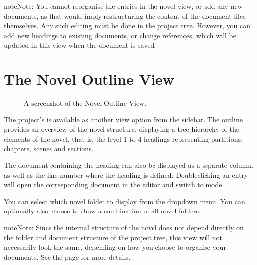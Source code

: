 \documentclass[a4paper,11pt,english]{sphinxmanual}
\begin{document}
\begin{sphinxadmonition}{note}{Note:}
\sphinxAtStartPar
You cannot reorganise the entries in the novel view, or add any new documents, as that would
imply restructuring the content of the document files themselves. Any such editing must be done
in the project tree. However, you can add new headings to existing documents, or change
references, which will be updated in this view when the document is saved.
\end{sphinxadmonition}


\section{The Novel Outline View}
\label{\detokenize{usage_project:the-novel-outline-view}}\label{\detokenize{usage_project:a-ui-outline}}
\begin{figure}[htbp]
\centering
\capstart

\noindent{}
\caption{A screenshot of the Novel Outline View.}\label{\detokenize{usage_project:id5}}\end{figure}

\sphinxAtStartPar
The project’s  is available as another view option from the sidebar. The
outline provides an overview of the novel structure, displaying a tree hierarchy of the elements of
the novel, that is, the level 1 to 4 headings representing partitions, chapters, scenes and
sections.

\sphinxAtStartPar
The document containing the heading can also be displayed as a separate column, as well as the line
number where the heading is defined. Double\sphinxhyphen{}clicking an entry will open the corresponding document
in the editor and switch to  mode.

\sphinxAtStartPar
You can select which novel folder to display from the dropdown menu. You can optionally also choose
to show a combination of all novel folders.

\begin{sphinxadmonition}{note}{Note:}
\sphinxAtStartPar
Since the internal structure of the novel does not depend directly on the folder and document
structure of the project tree, this view will not necessarily look the same, depending on how
you choose to organise your documents. See the {\hyperref[\detokenize{project_structure:a-struct}]{}} page for more details.
\end{sphinxadmonition}
\end{document}

